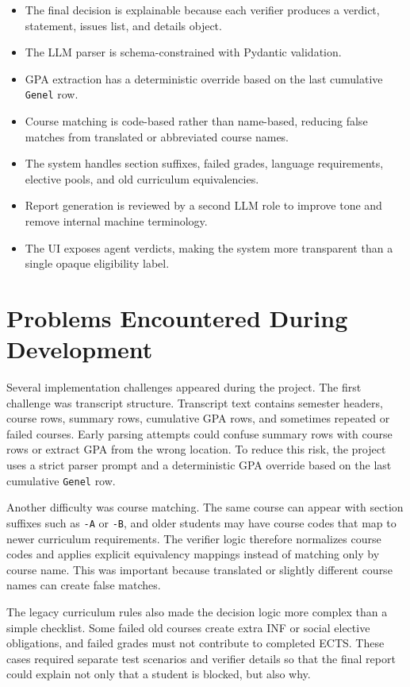 \documentclass[11pt,a4paper]{article}
\begin{document}
\begin{itemize}
  \item The final decision is explainable because each verifier produces a
  verdict, statement, issues list, and details object.
  \item The LLM parser is schema-constrained with Pydantic validation.
  \item GPA extraction has a deterministic override based on the last
  cumulative \texttt{Genel} row.
  \item Course matching is code-based rather than name-based, reducing false
  matches from translated or abbreviated course names.
  \item The system handles section suffixes, failed grades, language
  requirements, elective pools, and old curriculum equivalencies.
  \item Report generation is reviewed by a second LLM role to improve tone and
  remove internal machine terminology.
  \item The UI exposes agent verdicts, making the system more transparent than
  a single opaque eligibility label.
\end{itemize}

\section{Problems Encountered During Development}

Several implementation challenges appeared during the project. The first
challenge was transcript structure. Transcript text contains semester headers,
course rows, summary rows, cumulative GPA rows, and sometimes repeated or
failed courses. Early parsing attempts could confuse summary rows with course
rows or extract GPA from the wrong location. To reduce this risk, the project
uses a strict parser prompt and a deterministic GPA override based on the last
cumulative \texttt{Genel} row.

Another difficulty was course matching. The same course can appear with section
suffixes such as \texttt{-A} or \texttt{-B}, and older students may have course
codes that map to newer curriculum requirements. The verifier logic therefore
normalizes course codes and applies explicit equivalency mappings instead of
matching only by course name. This was important because translated or slightly
different course names can create false matches.

The legacy curriculum rules also made the decision logic more complex than a
simple checklist. Some failed old courses create extra INF or social elective
obligations, and failed grades must not contribute to completed ECTS. These
cases required separate test scenarios and verifier details so that the final
report could explain not only that a student is blocked, but also why.
\end{document}
